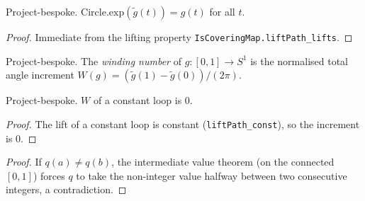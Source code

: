 \begin{lemma}

  \label{lem:angle_lift_lifts}
  Project-bespoke. $\mathrm{Circle.exp}(\widetilde g(t)) = g(t)$ for all $t$.
\end{lemma}
\begin{proof}

\leanok
  Immediate from the lifting property \texttt{IsCoveringMap.liftPath\_lifts}.
\end{proof}

\begin{definition}

  \label{def:winding_number}
  Project-bespoke. The \emph{winding number} of $g : [0,1] \to S^1$ is the
  normalised total angle increment $W(g) = (\widetilde g(1) - \widetilde g(0))/(2\pi)$.
\end{definition}

\begin{lemma}

  \label{lem:winding_number_const}
  Project-bespoke. $W$ of a constant loop is $0$.
\end{lemma}
\begin{proof}

\leanok
  The lift of a constant loop is constant (\texttt{liftPath\_const}), so the
  increment is $0$.
\end{proof}

\begin{proof}

\leanok
  If $q(a) \ne q(b)$, the intermediate value theorem (on the connected $[0,1]$)
  forces $q$ to take the non-integer value halfway between two consecutive
  integers, a contradiction.
\end{proof}

